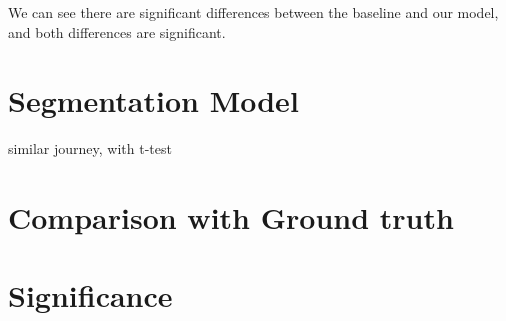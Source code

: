 We can see there are significant differences between the baseline and our model, and both differences are significant. 

\section{Segmentation Model}
similar journey, with t-test

\section{Comparison with Ground truth}

\section{Significance}







